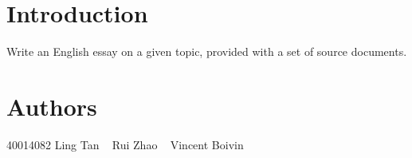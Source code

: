 \hypertarget{index_Introduction}{}\section{Introduction}\label{index_Introduction}
Write an English essay on a given topic, provided with a set of source documents.\hypertarget{index_Authors}{}\section{Authors}\label{index_Authors}
40014082 Ling Tan ~ Rui Zhao ~ Vincent Boivin 